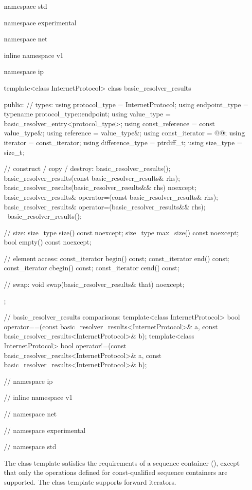 \begin{codeblock}
namespace std {
namespace experimental {
namespace net {
inline namespace v1 {
namespace ip {

  template<class InternetProtocol>
  class basic_resolver_results
  {
  public:
    // types:
    using protocol_type = InternetProtocol;
    using endpoint_type = typename protocol_type::endpoint;
    using value_type = basic_resolver_entry<protocol_type>;
    using const_reference = const value_type&;
    using reference = value_type&;
    using const_iterator = @@;
    using iterator = const_iterator;
    using difference_type = ptrdiff_t;
    using size_type = size_t;

    // construct / copy / destroy:
    basic_resolver_results();
    basic_resolver_results(const basic_resolver_results& rhs);
    basic_resolver_results(basic_resolver_results&& rhs) noexcept;
    basic_resolver_results& operator=(const basic_resolver_results& rhs);
    basic_resolver_results& operator=(basic_resolver_results&& rhs);
    ~basic_resolver_results();

    // size:
    size_type size() const noexcept;
    size_type max_size() const noexcept;
    bool empty() const noexcept;

    // element access:
    const_iterator begin() const;
    const_iterator end() const;
    const_iterator cbegin() const;
    const_iterator cend() const;

    // swap:
    void swap(basic_resolver_results& that) noexcept;
  };

  // basic_resolver_results comparisons:
  template<class InternetProtocol>
    bool operator==(const basic_resolver_results<InternetProtocol>& a,
                    const basic_resolver_results<InternetProtocol>& b);
  template<class InternetProtocol>
    bool operator!=(const basic_resolver_results<InternetProtocol>& a,
                    const basic_resolver_results<InternetProtocol>& b);

} // namespace ip
} // inline namespace v1
} // namespace net
} // namespace experimental
} // namespace std
\end{codeblock}

\pnum
The class template  satisfies the requirements of a sequence container (), except that only the operations defined for const-qualified sequence containers are supported. The class template  supports forward iterators.

